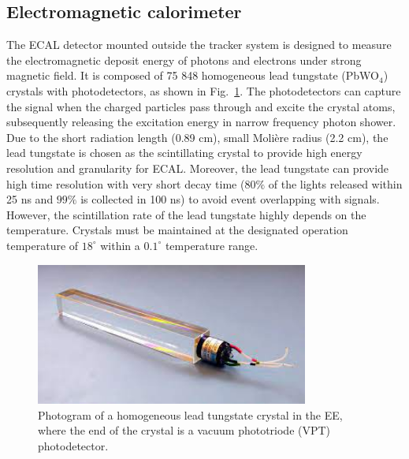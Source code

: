 \subsection{Electromagnetic calorimeter}
The ECAL detector mounted outside the tracker system is designed to measure the electromagnetic deposit energy of photons and electrons under strong magnetic field.
It is composed of 75 848 homogeneous lead tungstate (PbWO$_4$) crystals with photodetectors, as shown in Fig.~\ref{fig:cms_crystal}.
The photodetectors can capture the signal when the charged particles pass through and excite the crystal atoms, subsequently releasing the excitation energy in narrow frequency photon shower.
Due to the short radiation length (0.89 cm), small Molière radius (2.2 cm), the lead tungstate is chosen as the scintillating crystal to provide high energy resolution and granularity for ECAL.
Moreover, the lead tungstate can provide high time resolution with very short decay time ($80\%$ of the lights released within 25 ns and $99\%$ is collected in 100 ns) to avoid event overlapping with signals.
However, the scintillation rate of the lead tungstate highly depends on the temperature.
Crystals must be maintained at the designated operation temperature of $18^{\circ}$ within a $0.1^{\circ}$ temperature range.
\begin{figure}\centering
    \includegraphics[width=0.8\textwidth]{figure/cms_crystal.jpeg}
    \caption[Photogram of a homogeneous lead tungstate crystal in the EE.]
    {Photogram of a homogeneous lead tungstate crystal in the EE, where the end of the crystal is a vacuum phototriode (VPT) photodetector.}
    \label{fig:cms_crystal}
\end{figure}

